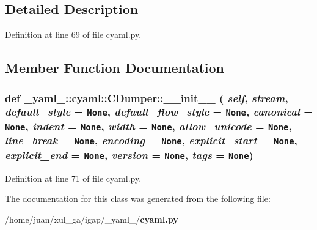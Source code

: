 \subsection{Detailed Description}


Definition at line 69 of file cyaml.py.

\subsection{Member Function Documentation}
\subsubsection{\setlength{\rightskip}{0pt plus 5cm}def \_\-yaml\_\-::cyaml::CDumper::\_\-\_\-init\_\-\_\- ( {\em self},  {\em stream},  {\em default\_\-style} = {\tt None},  {\em default\_\-flow\_\-style} = {\tt None},  {\em canonical} = {\tt None},  {\em indent} = {\tt None},  {\em width} = {\tt None},  {\em allow\_\-unicode} = {\tt None},  {\em line\_\-break} = {\tt None},  {\em encoding} = {\tt None},  {\em explicit\_\-start} = {\tt None},  {\em explicit\_\-end} = {\tt None},  {\em version} = {\tt None},  {\em tags} = {\tt None})}\label{class__yaml___1_1cyaml_1_1CDumper_9a89fb98793ac79bf56ce3ca40e9c46b}




Definition at line 71 of file cyaml.py.

The documentation for this class was generated from the following file:\begin{CompactItemize}
\item 
/home/juan/xul\_\-ga/igap/\_\-yaml\_\-/{\bf cyaml.py}\end{CompactItemize}
